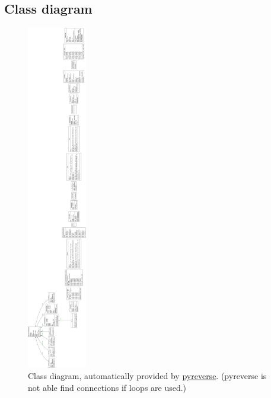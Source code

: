  \subsection*{Class diagram}
  \begin{figure}[H]
   \includegraphics[width=0.23\textwidth]{../Images/classdiagram.png}
   \centering
   \caption{Class diagram, automatically provided by \href{https://pypi.org/project/pyreverse/}{pyreverse}. (pyreverse is not able find connections if loops are 
   used.)}
   \label{fig:tree}
  \end{figure}\noindent
